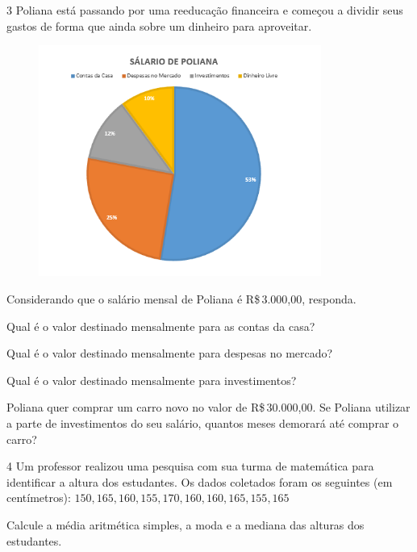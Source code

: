 \pagebreak

\num{3} Poliana está passando por uma reeducação financeira e começou a
dividir seus gastos de forma que ainda sobre um dinheiro para
aproveitar.

\begin{figure}[H]
\centering\includegraphics[width=3.65in,height=2.98179in]{./imgSAEB_8_MAT/media/image41.png}
\end{figure}

Considerando que o salário mensal de Poliana é R\$\,3.000,00, responda.

\begin{escolha}[itemsep=0pt]
\item Qual é o valor destinado mensalmente para as contas da casa?
\item Qual é o valor destinado mensalmente para despesas no mercado?
\item Qual é o valor destinado mensalmente para investimentos?
\item Poliana quer comprar um carro novo no valor de R\$\,30.000,00.
Se Poliana utilizar a parte de investimentos do seu salário, quantos meses
demorará até comprar o carro?
\end{escolha}


\pagebreak

\num{4} Um professor realizou uma pesquisa com sua turma de matemática para
identificar a altura dos estudantes. Os dados coletados foram os
seguintes (em centímetros): $150, 165, 160, 155, 170, 160, 160, 165, 155, 165$ 


Calcule a média aritmética simples, a moda e a mediana das alturas dos
estudantes.

